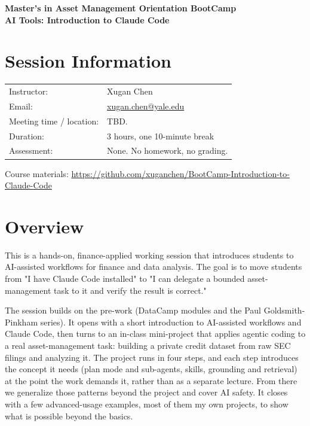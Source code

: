 \documentclass[11pt]{article}
\begin{document}
\begin{center}
    {\LARGE\bfseries
    Master's in Asset Management Orientation BootCamp\\
    \medskip
    AI Tools: Introduction to Claude Code
    }
\end{center}

\vspace{0.25\baselineskip}


\section*{Session Information}


\begin{tabular}{@{}ll@{}}
Instructor: & Xugan Chen \\
Email: & \href{mailto:xugan.chen@yale.edu}{xugan.chen@yale.edu} \\
Meeting time / location: & TBD. \\
Duration: & 3 hours, one 10-minute break \\
Assessment: & None. No homework, no grading. \\
\end{tabular}

Course materials: \url{https://github.com/xuganchen/BootCamp-Introduction-to-Claude-Code}

\section*{Overview}

This is a hands-on, finance-applied working session that introduces students to AI-assisted workflows for finance and data analysis. The goal is to move students from "I have Claude Code installed" to "I can delegate a bounded asset-management task to it and verify the result is correct."

The session builds on the pre-work (DataCamp modules and the Paul Goldsmith-Pinkham series). It opens with a short introduction to AI-assisted workflows and Claude Code, then turns to an in-class mini-project that applies agentic coding to a real asset-management task: building a private credit dataset from raw SEC filings and analyzing it. The project runs in four steps, and each step introduces the concept it needs (plan mode and sub-agents, skills, grounding and retrieval) at the point the work demands it, rather than as a separate lecture. From there we generalize those patterns beyond the project and cover AI safety. It closes with a few advanced-usage examples, most of them my own projects, to show what is possible beyond the basics.
\end{document}
